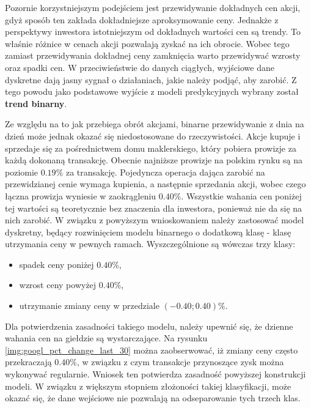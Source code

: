 \documentclass[a4paper, twoside, 11pt, openright]{article}
\begin{document}
Pozornie korzystniejszym podejściem jest przewidywanie dokładnych cen akcji, gdyż sposób ten zakłada dokładniejsze aproksymowanie ceny. Jednakże z perspektywy inwestora istotniejszym od dokładnych wartości cen są trendy. To właśnie różnice w cenach akcji pozwalają zyskać na ich obrocie. Wobec tego zamiast przewidywania dokładnej ceny zamknięcia warto przewidywać wzrosty oraz spadki cen. W przeciwieństwie do danych ciągłych, wyjściowe dane dyskretne  dają jasny sygnał o działaniach, jakie należy podjąć, aby zarobić. Z tego powodu jako podstawowe wyjście z modeli predykcyjnych wybrany został \textbf{trend binarny}.

\bigskip

Ze względu na to jak przebiega obrót akcjami, binarne przewidywanie z dnia na dzień może jednak okazać się niedostosowane do rzeczywistości. Akcje kupuje i sprzedaje się za pośrednictwem domu maklerskiego, który pobiera prowizje za każdą dokonaną transakcję. Obecnie najniższe prowizje na polskim rynku są na poziomie $0.19\%$ za transakcję. Pojedyncza operacja dająca zarobić na przewidzianej cenie wymaga kupienia, a następnie sprzedania akcji, wobec czego łączna prowizja wyniesie w zaokrągleniu $0.40\%$. Wszystkie wahania cen poniżej tej wartości są teoretycznie bez znaczenia dla inwestora, ponieważ nie da się na nich zarobić. W związku z powyższym wnioskowaniem należy zastosować model dyskretny, będący rozwinięciem modelu binarnego o dodatkową klasę - klasę utrzymania ceny w pewnych ramach. Wyszczególnione są wówczas trzy klasy:
\begin{itemize}
\item spadek ceny poniżej $0.40\%$,
\item wzrost ceny powyżej $0.40\%$,
\item utrzymanie zmiany ceny w przedziale $(-0.40; 0.40)\%$.
\end{itemize}

Dla potwierdzenia zasadności takiego modelu, należy upewnić się, że dzienne wahania cen na giełdzie są wystarczające. Na rysunku \ref{img:googl_pct_change_last_30} można zaobserwować, iż zmiany ceny często przekraczają $0.40\%$, w związku z czym transakcje przynoszące zysk można wykonywać regularnie. Wniosek ten potwierdza zasadność powyższej konstrukcji modeli. W związku z większym stopniem złożoności takiej klasyfikacji, może okazać się, że dane wejściowe nie pozwalają na odseparowanie tych trzech klas. 
\end{document}
